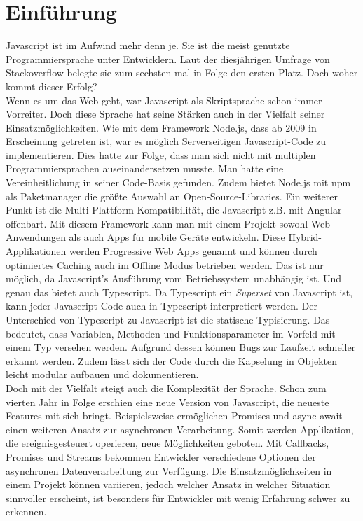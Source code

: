 \setcounter{secnumdepth}{1}

\section{Einführung}

Javascript ist im Aufwind mehr denn je. Sie ist die meist genutzte Programmiersprache unter Entwicklern. Laut der diesjährigen Umfrage von Stackoverflow belegte sie zum sechsten mal in Folge den ersten Platz\cite{programming-language-survey}. Doch woher kommt dieser Erfolg? \\

\noindent
Wenn es um das Web geht, war Javascript als Skriptsprache schon immer Vorreiter. Doch diese Sprache hat seine Stärken auch in der Vielfalt seiner Einsatzmöglichkeiten. Wie mit dem Framework Node.js, dass ab 2009 in Erscheinung getreten ist, war es möglich Serverseitigen Javascript-Code zu implementieren. Dies hatte zur Folge, dass man sich nicht mit multiplen Programmiersprachen auseinandersetzen musste. Man hatte eine Vereinheitlichung in seiner Code-Basis gefunden. Zudem bietet Node.js mit npm als Paketmanager die größte Auswahl an Open-Source-Libraries. Ein weiterer Punkt ist die Multi-Plattform-Kompatibilität, die Javascript z.B. mit Angular offenbart. Mit diesem Framework kann man mit einem Projekt sowohl Web-Anwendungen als auch Apps für mobile Geräte entwickeln. Diese Hybrid-Applikationen werden Progressive Web Apps genannt und können durch optimiertes Caching auch im Offline Modus betrieben werden. Das ist nur möglich, da Javascript's Ausführung vom Betriebssystem unabhängig ist. Und genau das bietet auch Typescript. Da Typescript ein \textit{Superset} von Javascript ist, kann jeder Javascript Code auch in Typescript interpretiert werden. Der Unterschied von Typescript zu Javascript ist die statische Typisierung. Das bedeutet, dass Variablen, Methoden und Funktionsparameter im Vorfeld mit einem Typ versehen werden. Aufgrund dessen können Bugs zur Laufzeit schneller erkannt werden. Zudem lässt sich der Code durch die Kapselung in Objekten leicht modular aufbauen und dokumentieren.\\

\noindent
Doch mit der Vielfalt steigt auch die Komplexität der Sprache. Schon zum vierten Jahr in Folge erschien eine neue Version von Javascript, die neueste Features mit sich bringt. Beispielsweise ermöglichen Promises und async await einen weiteren Ansatz zur asynchronen Verarbeitung. Somit werden Applikation, die ereignisgesteuert operieren, neue Möglichkeiten geboten. Mit Callbacks, Promises und Streams bekommen Entwickler verschiedene Optionen der asynchronen Datenverarbeitung zur Verfügung. Die Einsatzmöglichkeiten in einem Projekt können variieren, jedoch welcher Ansatz in welcher Situation sinnvoller erscheint, ist besonders für Entwickler mit wenig Erfahrung schwer zu erkennen.

